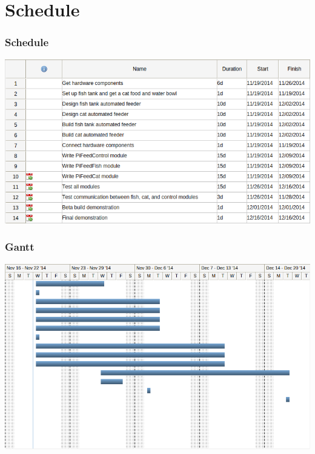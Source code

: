 \documentclass[]{beamer}
\begin{document}
\section{Schedule}
\begin{frame}
	\frametitle{Schedule}
     \includegraphics[width=\textwidth]{Schedule}
\end{frame}
\begin{frame}
	\frametitle{Gantt}
     \includegraphics[width=\textwidth]{Gantt}
\end{frame}
\end{document}
